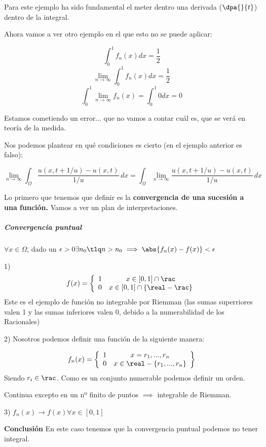 Para este ejemplo ha sido fundamental el meter dentro una derivada ($\dpa{}{t}$) dentro de la integral.

Ahora vamos a ver otro ejemplo en el que esto no se puede aplicar:

\begin{example}
\[\int_0^1 f_n(x)dx = \frac{1}{2}\]
\[\lim_{n\to\infty}\int_0^1 f_n(x)dx = \frac{1}{2}\]
\[\int_0^1 \lim_{n\to\infty} f_n(x) = \int_0^1 0dx = 0\]

Estamos cometiendo un error... que no vamos a contar cuál es, que se verá en teoría de la medida.
\end{example}

Nos podemos plantear en qué condiciones es cierto (en el ejemplo anterior es falso):

\[\lim_{n\to\infty} \int_{\Omega}\frac{u(x,t+1/u)-u(x,t)}{1/u} \,dx = \int_{\Omega}\lim_{n\to\infty}\frac{u(x,t+1/u)-u(x,t)}{1/u} \,dx
\]

Lo primero que tenemos que definir es la \textbf{convergencia de una sucesión a una función.} Vamos a ver un plan de interpretaciones.

\subparagraph{\textit{Convergencia puntual}}

$\forall x\in\Omega$, dado un $\epsilon>0\\ \exists n_0 \tlq n>n_0 \implies \abs{f_n(x)-f(x)}<\epsilon$

\begin{example}
1) \[f(x) = \left\{\begin{array}{cc}
1 & x\in[0,1]\cap \rac\\
0 & x\in[0,1]\cap\{\real-\rac\}
\end{array}\right.\]
Este es el ejemplo de función no integrable por Riemman (las sumas superriores valen 1 y las sumas inferiores valen 0, debido a la numerabilidad de los Racionales)

2)
Nosotros podemos definir una función de la siguiente manera: 

\[f_n(x) = \left\{\begin{array}{cc}
1 & x=r_1,...,r_n\\
0 & x\in\real-\{r_1,...,r_n\}
\end{array}\right\}\]
Siendo $r_i\in\rac$. Como es un conjunto numerable podemos definir un orden.

Continua excepto en un nº finito de puntos $\implies$ integrable de Riemman.

3) $f_n(x)\to f(x) \forall x\in[0,1]$


\textbf{Conclusión} En este caso tenemos que la convergencia puntual podemos no tener integral. 
\end{example}

